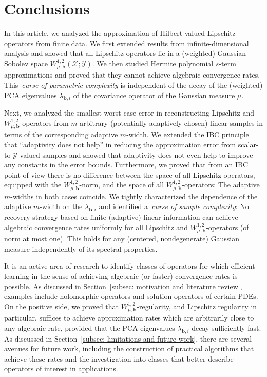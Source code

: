 \documentclass[namedate,webpdf]{ima-authoring-template-blank}
\numberwithin{counter}{section}
\numberwithin{equation}{section}
\theoremstyle{plain}
\theoremstyle{definition}
\newcommand*{\cX}{\mathcal{X}}
\newcommand*{\cY}{\mathcal{Y}}
\theoremstyle{thmstyletwo}
\begin{document}
\section{Conclusions}

In this article, we analyzed the approximation of Hilbert-valued Lipschitz operators from finite data. We first extended results from infinite-dimensional analysis and showed that all Lipschitz operators lie in a (weighted) Gaussian Sobolev space \(W_{\mu, \bm{b}}^{1, 2}(\cX; \cY)\).
We then studied Hermite polynomial \(s\)-term approximations and proved that they cannot achieve algebraic convergence rates. This~\emph{curse of parametric complexity} is independent of the decay of the (weighted) PCA eigenvalues \(\lambda_{\bm{b}, i}\) of the covariance operator of the Gaussian measure \(\mu\). 

Next, we analyzed the smallest worst-case error in reconstructing Lipschitz and \(W_{\mu, \bm{b}}^{1, 2}\)-operators from \(m\) arbitrary (potentially adaptively chosen) linear samples in terms of the corresponding adaptive \(m\)-width. 
We extended the IBC principle that ``adaptivity does not help'' in reducing the approximation error from scalar- to \(\cY\)-valued samples and showed that adaptivity does not even help to improve any constants in the error bounds. Furthermore, we proved that from an IBC point of view there is no difference between the space of all Lipschitz operators, equipped with the \(W_{\mu, \bm{b}}^{1, 2}\)-norm, and the space of all \(W_{\mu, \bm{b}}^{1, 2}\)-operators: The adaptive \(m\)-widths in both cases coincide. We tightly characterized the dependence of the adaptive \(m\)-width on the \(\lambda_{\bm{b}, i}\) and identified a~\emph{curse of sample complexity}: No recovery strategy based on finite (adaptive) linear information can achieve algebraic convergence rates uniformly for all Lipschitz and \(W_{\mu, \bm{b}}^{1, 2}\)-operators (of norm at most one). This holds for any (centered, nondegenerate) Gaussian measure independently of its spectral properties. 

It is an active area of research to identify classes of operators for which efficient learning in the sense of achieving algebraic (or faster) convergence rates is possible. As discussed in Section~\ref{subsec: motivation and literature review}, examples include holomorphic operators and solution operators of certain PDEs. On the positive side, we proved that \(W_{\mu, \bm{b}}^{1, 2}\)-regularity, and Lipschitz regularity in particular, suffices to achieve approximation rates which are arbitrarily close to any algebraic rate, provided that the PCA eigenvalues \(\lambda_{\bm{b}, i}\) decay sufficiently fast. As discussed in Section~\ref{subsec: limitations and future work}, there are several avenues for future work, including the construction of practical algorithms that achieve these rates and the investigation into classes that better describe operators of interest in applications.
\end{document}

